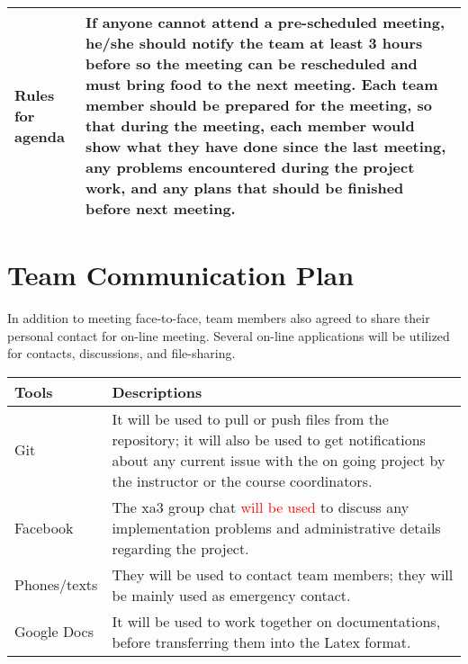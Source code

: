 \documentclass{article}
\begin{document}
\begin{tabular}{|p{3cm}|p{8cm}|}
Rules for agenda & If anyone cannot attend a pre-scheduled meeting, he/she should notify the team at least 3 hours before so the meeting can be rescheduled and must bring food to the next meeting. Each team member should be prepared for the meeting, so that during the meeting, each member would show what they have done since the last meeting, any problems encountered during the project work, and any plans that should be finished before next meeting.  \\ \hline
\end{tabular}




\section {Team Communication Plan} 

In addition to meeting face-to-face, team members also agreed to share their personal contact for on-line meeting. Several on-line applications will be utilized for contacts, discussions, and file-sharing.\\ 

\begin{tabular}{|p{3cm}|p{8cm}|}
\hline
\textbf{Tools}    & \textbf{Descriptions}                                                                                                                                                                                                                                                                                                                                                                                                                                \\\hline
Git        & It will be used to pull or push files from the repository; it will also be used to get notifications about any current issue with the on going project by the instructor or the course coordinators. \\\hline
Facebook    & The xa3 group chat \textcolor{red}{will be used} to discuss any implementation problems and administrative details regarding the project. \\\hline
Phones/texts   & They will be used to contact team members; they will be mainly used as emergency contact. \\\hline
Google Docs   & It will be used to work together on documentations, before transferring them into the Latex format. \\\hline
\end{tabular}
\end{document}
